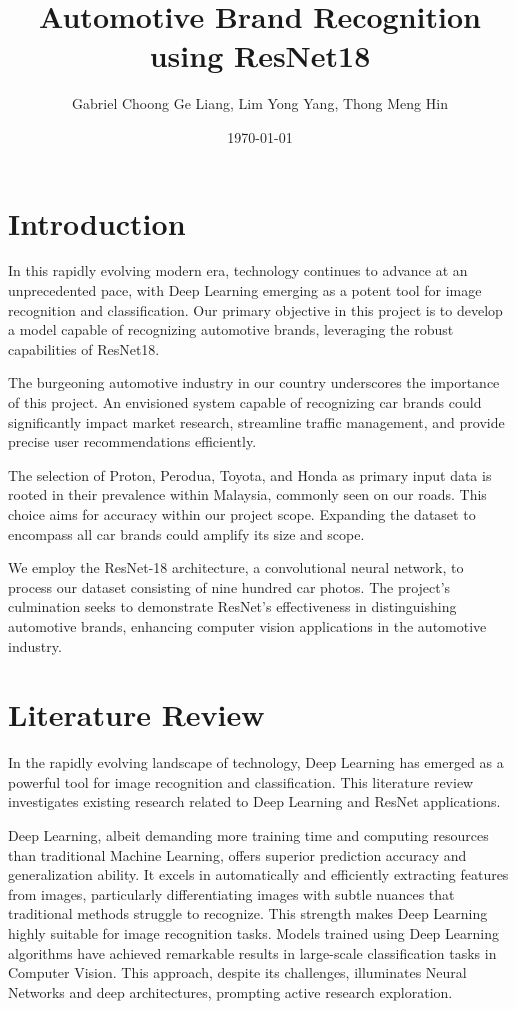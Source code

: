 \documentclass{article}
\title{Automotive Brand Recognition using ResNet18}
\author{Gabriel Choong Ge Liang, Lim Yong Yang, Thong Meng Hin}
\date{\today}
\begin{document}
\maketitle

\section{Introduction}
In this rapidly evolving modern era, technology continues to advance at an unprecedented pace, with Deep Learning emerging as a potent tool for image recognition and classification. Our primary objective in this project is to develop a model capable of recognizing automotive brands, leveraging the robust capabilities of ResNet18.

The burgeoning automotive industry in our country underscores the importance of this project. An envisioned system capable of recognizing car brands could significantly impact market research, streamline traffic management, and provide precise user recommendations efficiently.

The selection of Proton, Perodua, Toyota, and Honda as primary input data is rooted in their prevalence within Malaysia, commonly seen on our roads. This choice aims for accuracy within our project scope. Expanding the dataset to encompass all car brands could amplify its size and scope.

We employ the ResNet-18 architecture, a convolutional neural network, to process our dataset consisting of nine hundred car photos. The project's culmination seeks to demonstrate ResNet's effectiveness in distinguishing automotive brands, enhancing computer vision applications in the automotive industry.

\section{Literature Review}
In the rapidly evolving landscape of technology, Deep Learning has emerged as a powerful tool for image recognition and classification. This literature review investigates existing research related to Deep Learning and ResNet applications.

Deep Learning, albeit demanding more training time and computing resources than traditional Machine Learning, offers superior prediction accuracy and generalization ability. It excels in automatically and efficiently extracting features from images, particularly differentiating images with subtle nuances that traditional methods struggle to recognize. This strength makes Deep Learning highly suitable for image recognition tasks. Models trained using Deep Learning algorithms have achieved remarkable results in large-scale classification tasks in Computer Vision. This approach, despite its challenges, illuminates Neural Networks and deep architectures, prompting active research exploration.
\end{document}
